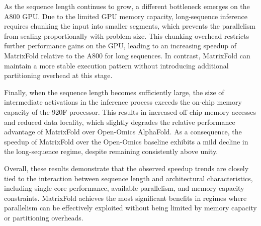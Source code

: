 As the sequence length continues to grow, a different bottleneck emerges on the A800 GPU. Due to the limited GPU memory capacity, long-sequence inference requires chunking the input into smaller segments, which prevents the parallelism from scaling proportionally with problem size. This chunking overhead restricts further performance gains on the GPU, leading to an increasing speedup of MatrixFold relative to the A800 for long sequences. In contrast, MatrixFold can maintain a more stable execution pattern without introducing additional partitioning overhead at this stage.

Finally, when the sequence length becomes sufficiently large, the size of intermediate activations in the inference process exceeds the on-chip memory capacity of the 920F processor. This results in increased off-chip memory accesses and reduced data locality, which slightly degrades the relative performance advantage of MatrixFold over Open-Omics AlphaFold. As a consequence, the speedup of MatrixFold over the Open-Omics baseline exhibits a mild decline in the long-sequence regime, despite remaining consistently above unity.

Overall, these results demonstrate that the observed speedup trends are closely tied to the interaction between sequence length and architectural characteristics, including single-core performance, available parallelism, and memory capacity constraints. MatrixFold achieves the most significant benefits in regimes where parallelism can be effectively exploited without being limited by memory capacity or partitioning overheads.




